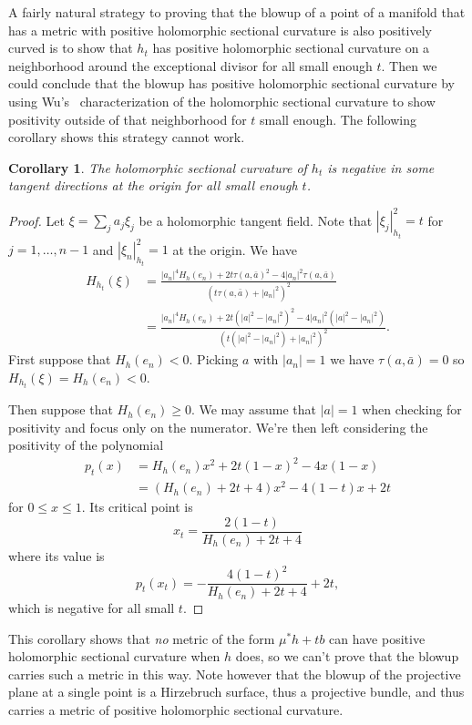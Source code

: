 \documentclass[10pt,a4paper]{amsart}
\newtheorem{coro}[theo]{Corollary}
\def\hsc{holomorphic sectional curvature}
\begin{document}
A fairly natural strategy to proving that the blowup of a point of a manifold
that has a metric with positive \hsc{} is also positively curved is to
show that $h_t$ has positive \hsc{} on a neighborhood around the exceptional
divisor for all small enough $t$. Then we could conclude that the blowup has
positive \hsc{} by using Wu's~\cite{wu1973remark} characterization of the
\hsc{} to show positivity outside of that neighborhood for $t$ small enough.
The following corollary shows this strategy cannot work.


\begin{coro}
The holomorphic sectional curvature of $h_t$ is negative in
some tangent directions at the origin for all small enough $t$.
\end{coro}

\begin{proof}
Let $\xi = \sum_j a_j \xi_j$ be a holomorphic tangent field.
Note that $|\xi_j|_{h_t}^2 = t$ for $j = 1, \ldots, n-1$ and $|\xi_n|_{h_t}^2 = 1$
at the origin.
We have
\begin{align*}
H_{h_t}(\xi)
&= \frac{|a_n|^4 H_h(e_n)
+ 2t \tau(a, \bar a)^2
- 4 |a_n|^2 \tau(a, \bar a)}{(t \tau(a, \bar a) + |a_n|^2)^2}
\\
&= \frac{|a_n|^4 H_h(e_n)
+ 2t (|a|^2 - |a_n|^2)^2
- 4 |a_n|^2 (|a|^2 - |a_n|^2)}{(t (|a|^2 - |a_n|^2) + |a_n|^2)^2}.
\end{align*}
First suppose that $H_h(e_n) < 0$. Picking $a$ with $|a_n| = 1$ we have
$\tau(a, \bar a) = 0$ so $H_{h_t}(\xi) = H_h(e_n) < 0$.

Then suppose that $H_h(e_n) \geq 0$.
We may assume that $|a| = 1$ when checking for positivity and focus only on
the numerator. We're then left considering the positivity of the polynomial
\begin{align*}
p_t(x)
&= H_h(e_n) x^2 + 2t(1-x)^2 - 4x(1-x)
\\
&= (H_h(e_n) + 2t + 4) x^2 - 4(1 - t) x + 2t
\end{align*}
for $0 \leq x \leq 1$.
Its critical point is
$$
x_t = \frac{2(1-t)}{H_h(e_n) + 2t + 4}
$$
where its value is
$$
p_t(x_t) = -\frac{4(1-t)^2}{H_h(e_n) + 2t + 4} + 2t,
$$
which is negative for all small $t$.
\end{proof}


This corollary shows that \emph{no} metric of the form $\mu^* h + tb$ can have
positive \hsc{} when $h$ does, so we can't prove that the blowup carries such
a metric in this way.
Note however that the blowup of the projective plane at a single point
is a Hirzebruch surface, thus a projective bundle, and thus carries
a metric of positive \hsc{}.
\end{document}
